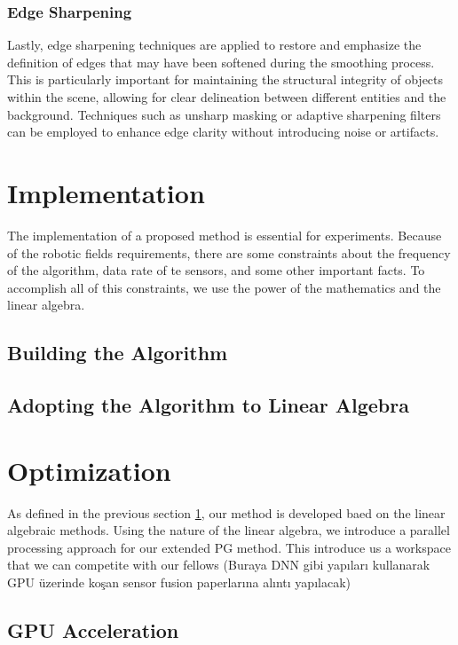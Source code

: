 \documentclass[conference]{IEEEtran}
\begin{document}
\subsubsection{Edge Sharpening}

Lastly, edge sharpening techniques are applied to restore and emphasize the definition of edges that may have been softened during the smoothing process. This is particularly important for maintaining the structural integrity of objects within the scene, allowing for clear delineation between different entities and the background. Techniques such as unsharp masking or adaptive sharpening filters can be employed to enhance edge clarity without introducing noise or artifacts.

\section{Implementation} \label{implementation}

The implementation of a proposed method is essential for experiments. Because of the robotic fields requirements, there are some constraints about the frequency of the algorithm, data rate of te sensors, and some other important facts. To accomplish all of this constraints, we use the power of the mathematics and the linear algebra. 

\subsection{Building the Algorithm}

\subsection{Adopting the Algorithm to Linear Algebra}

\section{Optimization}

As defined in the previous section \ref{implementation}, our method is developed baed on the linear algebraic methods. Using the nature of the linear algebra, we introduce a parallel processing approach for our extended PG method. This introduce us a workspace that we can competite with our fellows (Buraya DNN gibi yapıları kullanarak GPU üzerinde koşan sensor fusion paperlarına alıntı yapılacak)

\subsection{GPU Acceleration}
\end{document}
